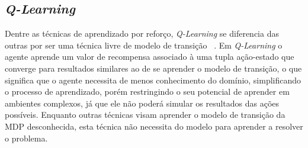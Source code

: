 






\subsection{\label{sec:secao4.5}\textit{Q-Learning}}

Dentre as técnicas de aprendizado por reforço, \textit{Q-Learning} se diferencia das outras por ser uma técnica livre de modelo de transição ~\cite{QLEARNING}. Em \textit{Q-Learning} o agente aprende um valor de recompensa associado à uma tupla ação-estado que converge para resultados similares ao de se aprender o modelo de transição, o que significa que o agente necessita de menos conhecimento do domínio, simplificando o processo de aprendizado, porém restringindo o seu potencial de aprender em ambientes complexos, já que ele não poderá simular os resultados das ações possíveis. Enquanto outras técnicas visam aprender o modelo de transição da MDP desconhecida, esta técnica não necessita do modelo para aprender a resolver o problema.

